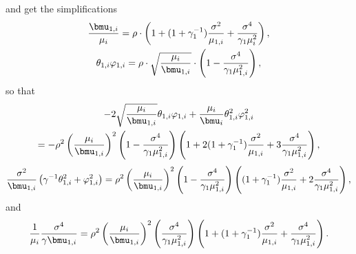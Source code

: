 and get the simplifications
\begin{gather*}
    \frac{\bmu_{1,i}}{\mu_i}
        =
            \rho
            \cdot
            \left(
                1
                +
                (1 + \gamma_1^{-1})
                \frac{\sigma^2}{\mu_{1,i}}
                +
                \frac{\sigma^4}{\gamma_1 \mu_i^2}
            \right), \\
    \theta_{1,i} \varphi_{1,i}
        =
            \rho
            \cdot
            \sqrt{\frac{\mu_i}{\bmu_{1,i}}}
            \cdot
            \left(
                1
                -
                \frac{\sigma^4}{\gamma_1 \mu_{1,i}^2}
            \right),
\end{gather*}
so that
\begin{multline*}
    -2 \sqrt{\frac{\mu_i}{\bmu_{1,i}}} \theta_{1,i} \varphi_{1,i}
    +
    \frac{\mu_i}{\bmu_i} \theta_{1,i}^2 \varphi_{1,i}^2 \\
        =
            -
            \rho^2
            \left(
                \frac{\mu_i}{\bmu_{1,i}}
            \right)^2
            \left(
                1
                -
                \frac{\sigma^4}{\gamma_1 \mu_{1,i}^2}
            \right)
            \left(
                1
                +
                2( 1 + \gamma_1^{-1}) \frac{\sigma^2}{\mu_{1,i}}
                +
                3
                \frac{\sigma^4}{\gamma_1 \mu_{1,i}^2}
            \right),
\end{multline*}
\[
    \frac{\sigma^2}{\bmu_{1,i}}
    \left(
        \gamma^{-1} \theta_{1,i}^2
        +
        \varphi_{1,i}^2
    \right)
        =
            \rho^2
            \left(
                \frac{\mu_i}{\bmu_{1,i}}
            \right)^2
            \left(
                1
                -
                \frac{\sigma^4}{\gamma_1 \mu_{1,i}^2}
            \right)
            \left(
                (1 + \gamma_1^{-1})
                \frac{\sigma^2}{\mu_{1,i}}
                +
                2
                \frac{\sigma^4}{\gamma_1 \mu_{1,i}^2}
            \right),
\]
and
\[
    \frac{1}{\mu_i}
    \frac{\sigma^4}{\gamma \bmu_{1,i}}
        =
            \rho^2
            \left(
                \frac{\mu_i}{\bmu_{1,i}}
            \right)^2
            \left(
                \frac{\sigma^4}{\gamma_1 \mu_{1,i}^2}
            \right)
            \left(
                1
                +
                (1 + \gamma_1^{-1})
                \frac{\sigma^2}{\mu_{1,i}}
                +
                \frac{\sigma^4}{\gamma_1 \mu_{1,i}^2}
            \right).
\]
